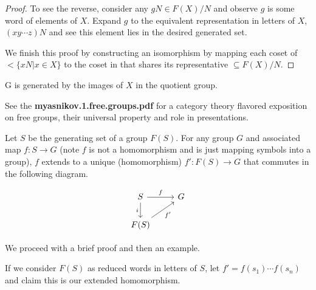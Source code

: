 \documentclass[10pt]{article}
\begin{document}
\begin{definition}
\begin{definition}
\begin{proof}
To see the reverse, consider any $gN \in F(X) / N$ and observe $g$ is some word of
elements of $X$. Expand $g$ to the equivalent representation in letters of
$X$, $(xy \cdots z)N$ and see this element lies in the desired generated set.

We finish this proof by constructing an isomorphism by mapping each coset of $<
\{ xN | x \in X \}$ to the coset in that shares its representative $\subseteq
F(X) / N$.
\end{proof}

\begin{proposition}
	G is generated by the images of $X$ in the quotient group.
\end{proposition}

% 
% 

\begin{note}
	See the \textbf{myasnikov.1.free.groups.pdf} for a category theory flavored exposition on free
	groups, their universal property and role in presentations.
\end{note}

\begin{note}
Let $S$ be the generating set of a group $F(S)$. For any group $G$ and associated
map $f: S \to G$ (note $f$ is not a homomorphism and is just mapping symbols
into a group), $f$ extends to a unique (homomorphism) $f': F(S) \to G$ that commutes in the following diagram.

\[
\begin{tikzcd}
S \arrow[r, "f"] \arrow[d, "i"'] & G \\
F(S) \arrow[ru, "f'"']           &  
\end{tikzcd}
\]

We proceed with a brief proof and then an example.

If we consider $F(S)$ as reduced words in letters of $S$, let $f' =
f(s_1)\cdots f(s_n)$ and claim this is our extended homomorphism.


\end{note}
\end{definition}
\end{definition}
\end{document}
